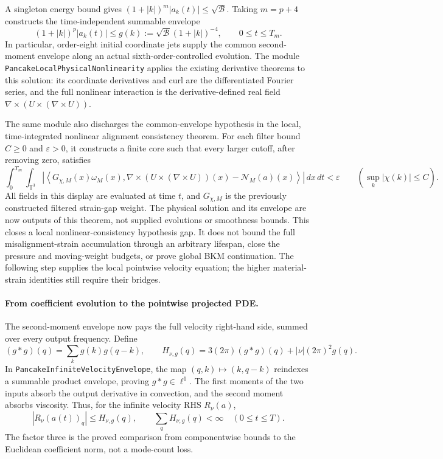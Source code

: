 \documentclass[11pt]{article}
\theoremstyle{definition}
\begin{document}
A singleton energy bound gives
$(1+|k|)^m|a_k(t)|\le\sqrt{\mathcal B}$.
Taking $m=p+4$ constructs the time-independent summable envelope
\[
 (1+|k|)^p|a_k(t)|
       \le g(k):=\sqrt{\mathcal B}(1+|k|)^{-4},
       \qquad 0\le t\le T_m.
\]
In particular, order-eight initial coordinate jets supply the common
second-moment envelope along an actual sixth-order-controlled evolution.
The module \texttt{PancakeLocalPhysicalNonlinearity} applies the existing
derivative theorems to this solution: its coordinate derivatives and curl
are the differentiated Fourier series, and the full nonlinear interaction
is the derivative-defined real field
$\nabla\times(U\times(\nabla\times U))$.

The same module also discharges the common-envelope hypothesis in the
local, time-integrated nonlinear alignment consistency theorem. For each
filter bound $C\ge0$ and $\varepsilon>0$, it constructs a finite core such
that every larger cutoff, after removing zero, satisfies
\[
 \int_0^{T_m}\!\int_{\mathbb T^3}
 \left|\left\langle
   G_{\chi,M}(x)\omega_M(x),
   \nabla\times(U\times(\nabla\times U))(x)-\mathcal N_M(a)(x)
 \right\rangle\right|\,dx\,dt<\varepsilon
 \qquad(\sup_k|\chi(k)|\le C).
\]
All fields in this display are evaluated at time $t$, and $G_{\chi,M}$
is the previously constructed filtered strain-gap weight. The physical
solution and its envelope are now outputs of this theorem, not supplied
evolutions or smoothness bounds.
This closes a local nonlinear-consistency hypothesis gap. It does not
bound the full misalignment-strain accumulation through an arbitrary
lifespan, close the pressure and moving-weight budgets, or prove global
BKM continuation. The following step supplies the local pointwise velocity
equation; the higher material-strain identities still require their bridges.

\paragraph{From coefficient evolution to the pointwise projected PDE.}
The second-moment envelope now pays the full velocity right-hand side,
summed over every output frequency. Define
\[
 (g*g)(q)=\sum_k g(k)g(q-k),\qquad
 H_{\nu,g}(q)=3(2\pi)(g*g)(q)+|\nu|(2\pi)^2g(q).
\]
In \texttt{PancakeInfiniteVelocityEnvelope}, the map
$(q,k)\mapsto(k,q-k)$ reindexes a summable product envelope, proving
$g*g\in\ell^1$. The first moments of the two inputs absorb the output
derivative in convection, and the second moment absorbs viscosity.
Thus, for the infinite velocity RHS $R_\nu(a)$,
\[
 |R_\nu(a(t))_q|\le H_{\nu,g}(q),\qquad
 \sum_q H_{\nu,g}(q)<\infty\quad(0\le t\le T).
\]
The factor three is the proved comparison from componentwise bounds to
the Euclidean coefficient norm, not a mode-count loss.
\end{document}
